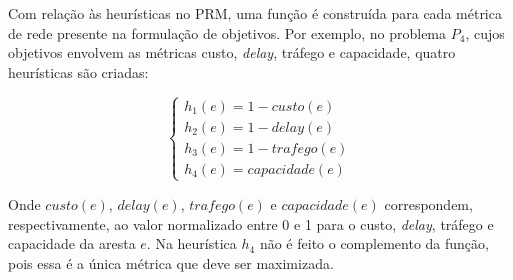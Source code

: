 Com relação às heurísticas no PRM, uma função é construída para cada métrica de rede presente na formulação de objetivos. Por exemplo, no problema $P_4$, cujos objetivos envolvem as métricas custo, \textit{delay}, tráfego e capacidade, quatro heurísticas são criadas:

\[ \begin{cases} 
	h_1(e) = 1 - custo(e) \\
	h_2(e) = 1 - delay(e) \\
	h_3(e) = 1 - trafego(e) \\
	h_4(e) = capacidade(e)
	\end{cases}
\]

Onde $custo(e)$, $delay(e)$, $trafego(e)$ e $capacidade(e)$ correspondem, respectivamente, ao valor normalizado entre 0 e 1 para o custo, \textit{delay}, tráfego e capacidade da aresta $e$. Na heurística $h_4$ não é feito o complemento da função, pois essa é a única métrica que deve ser maximizada.